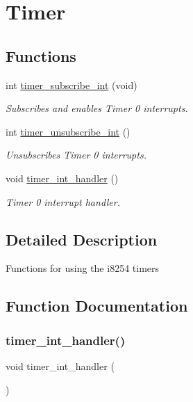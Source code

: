 \hypertarget{group___timer}{}\section{Timer}
\label{group___timer}
\subsection*{Functions}
\begin{DoxyCompactItemize}
\item 
int \hyperlink{group___timer_ga4c5d9f47323eda494cfd826f6d62eec9}{timer\+\_\+subscribe\+\_\+int} (void)
\begin{DoxyCompactList}\small\item\em Subscribes and enables Timer 0 interrupts. \end{DoxyCompactList}\item 
int \hyperlink{group___timer_gab9eea51549744bca5c5c923b388bb4ee}{timer\+\_\+unsubscribe\+\_\+int} ()
\begin{DoxyCompactList}\small\item\em Unsubscribes Timer 0 interrupts. \end{DoxyCompactList}\item 
void \hyperlink{group___timer_ga10fc9c867b15c7da6649311c9987cd17}{timer\+\_\+int\+\_\+handler} ()
\begin{DoxyCompactList}\small\item\em Timer 0 interrupt handler. \end{DoxyCompactList}\end{DoxyCompactItemize}


\subsection{Detailed Description}
Functions for using the i8254 timers 

\subsection{Function Documentation}
\mbox{\label{group___timer_ga10fc9c867b15c7da6649311c9987cd17}} 
\subsubsection{\texorpdfstring{timer\+\_\+int\+\_\+handler()}{timer\_int\_handler()}}
{\footnotesize\ttfamily void timer\+\_\+int\+\_\+handler (\begin{DoxyParamCaption}{ }\end{DoxyParamCaption})}



